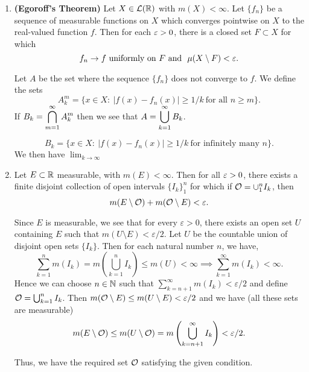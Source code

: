 \documentclass[12pt]{article}
\begin{document}
\begin{enumerate}
    \item \textbf{(Egoroff's Theorem)} Let $X \in \mathcal{L}(\mathbb{R})$ with  $m(X) < \infty$. Let $\{f_n\}$ be a sequence of measurable functions on $X$ which converges pointwise on $X$ to the real-valued function $f$. Then for each $\varepsilon > 0$, there is a closed set  $F \subset X$ for which 
    $$ f_n \to f \ \text{uniformly on} \ F \ \text{and}\ \  \mu(X\setminus F) < \ep.$$
    \begin{mybox}
        Let $A$ be the set where the sequence
        $\{f_n\}$ does not converge to $f$. We define
        the sets
        $$A^m_k=\{x\in X:\ \left|f(x)-f_n(x)\right|
        \geq 1/k\ \text{for all $n\geq m$}\}.$$
        If $\displaystyle B_k=\bigcap_{m=1}^\infty{A^m_k}$ then
        we see that $\displaystyle A=\bigcup_{k=1}^\infty{B_k}$.
        
        $$B_k=\{x\in X:\ \left|f(x)-f_n(x)\right|
        \geq 1/k\ \text{for infinitely many $n$}\}.$$
        We then have $\lim_{k\to\infty}$
    \end{mybox}
    
    \item Let $E \subset \mathbb{R}$ measurable,  with $m(E) < \infty$. Then for all $\varepsilon > 0$, there exists a finite disjoint collection of open intervals $\{I_k\}_1^n$ for which if $ \mathcal{O} = \cup_1^n I_k$, then 
    $$ m(E \setminus \mathcal{O}) + m(\mathcal{O} \setminus E) < \varepsilon.$$
    \begin{mybox}
        Since $E$ is measurable, we see that for every
        $\varepsilon>0$, there exists an
        open set $U$ containing $E$ such that
        $m(U\setminus E)<\varepsilon/2$. Let $U$ be the
        countable union of disjoint open sets $\{I_k\}$.
        Then for each natural number $n$, we have,
        $$\sum_{k=1}^n{m(I_k)}=m\left(\bigcup_{k=1}^n{I_k}
        \right)\leq m(U)<\infty\implies
        \sum_{k=1}^\infty{m(I_k)}<\infty.$$
        Hence we can choose $n\in\mathbb{N}$ such that
        $\sum_{k=n+1}^{\infty}{m(I_k)}<\varepsilon/2$ and
        define $\mathcal{O}=\bigcup_{k=1}^n{I_k}$. Then
        $m(\mathcal{O}\setminus E)\leq m(U\setminus E)<\varepsilon/2$
        and we have (all these sets are measurable)
        $$m(E\setminus \mathcal{O})\leq 
        m(U\setminus \mathcal{O})=
        m\left(\bigcup_{k=n+1}^\infty{I_k}\right)
        <\varepsilon/2.$$

        Thus, we have the required set $\mathcal{O}$ satisfying
        the given condition.
    \end{mybox}
    

\end{enumerate}
\end{document}
